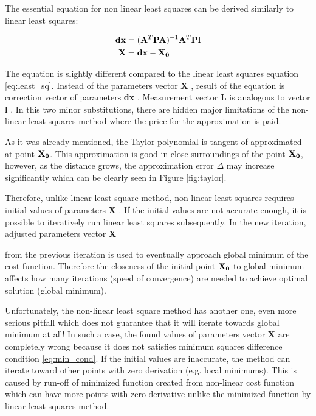 \documentclass[a4paper,12pt]{article}
\newcommand{\ematr}[1]{%
{\bf #1}%
}
\newcommand{\evect}[1]{%
{\bf #1}%
}
\begin{document}
The essential equation for non linear least squares can be derived 
similarly to linear least squares:

\begin{equation}
\begin{split}
\label{eq:non_least_sq}
\evect{dx} &= (\ematr{A}^{T} \ematr{P} \ematr{A})^{-1} \ematr{A}^{T} \ematr{P} \ematr{l} \\
\evect{X} &=  {\evect{dx} -  \evect{X_{0}}} \\
\end{split}
\end{equation}


The equation is slightly different compared to the linear least squares equation \eqref{eq:least_sq}.
 Instead of the parameters vector \evect{X}, result of the equation is 
 correction vector  of parameters \evect{dx}. Measurement vector \evect{L} is analogous to vector \evect{l}. In this two minor 
substitutions, there are hidden major limitations of the non-linear least squares method 
where the price for the approximation is paid. 


As it was already mentioned, the Taylor polynomial is tangent of approximated at point $\evect{X_{0}}$.
This approximation is good in close surroundings of the point $\evect{X_{0}}$, however, as the distance 
grows, the approximation error $\Delta$ may increase significantly which can be clearly seen in Figure \ref{fig:taylor}.

Therefore, unlike linear least square method, non-linear least squares requires initial 
values of parameters \evect{X}. If the initial values are not accurate 
enough, it is possible to iteratively run linear least squares subsequently.
In the new iteration, adjusted parameters vector \evect{X}
from the previous iteration is used to eventually approach global minimum of the cost function. 
Therefore the closeness of the initial point $\evect{X_{0}}$ to global minimum affects how many iterations (speed of convergence)
are needed to achieve optimal solution (global minimum).

Unfortunately, the non-linear least square method has another one, even more serious pitfall which 
does not guarantee that it will iterate towards global minimum at all!
In such a case, the found values of parameters vector \evect{X} are completely wrong because 
it does not satisfies minimum squares difference condition \eqref{eq:min_cond}. If the initial values are 
inaccurate, the method can iterate toward other points with zero derivation (e.g. local minimums).  
This is caused by run-off of minimized function created from non-linear cost function which can have more points with zero derivative
unlike the minimized function by linear least squares method.
\end{document}
